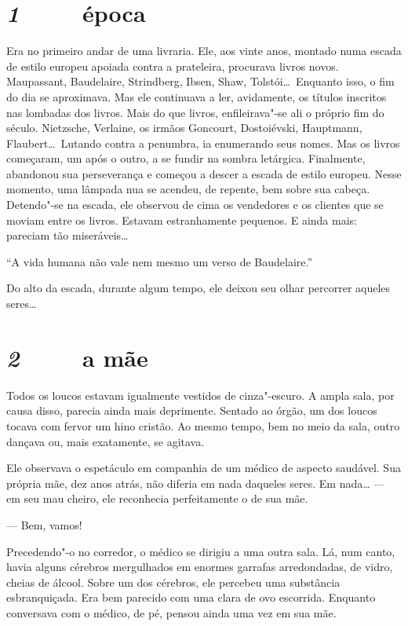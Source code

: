 \newcommand{\es}{\ \ \ \ \ }

\section*{\textit{1}\es época}
Era no primeiro andar de uma livraria. Ele, aos vinte anos, montado numa
escada de estilo europeu apoiada contra a prateleira, procurava livros
novos. Maupassant, Baudelaire, Strindberg, Ibsen, Shaw, Tolstói\ldots{}\
Enquanto isso, o fim do dia se aproximava. Mas ele continuava a ler,
avidamente, os títulos inscritos nas lombadas dos livros. Mais do que
livros, enfileirava"-se ali o próprio fim do século. Nietzsche,
Verlaine, os irmãos Goncourt, Dostoiévski, Hauptmann, Flaubert\ldots{}\
Lutando contra a penumbra, ia enumerando seus nomes. Mas os livros
começaram, um após o outro, a se fundir na sombra letárgica.
Finalmente, abandonou sua perseverança e começou a descer a escada de
estilo europeu. Nesse momento, uma lâmpada nua se acendeu, de repente,
bem sobre sua cabeça. Detendo"-se na escada, ele observou de cima os
vendedores e os clientes que se moviam entre os livros. Estavam
estranhamente pequenos. E ainda mais: pareciam tão miseráveis\ldots{}

``A vida humana não vale nem mesmo um verso de Baudelaire.''

Do alto da escada, durante algum tempo, ele deixou seu olhar percorrer
aqueles seres\ldots{}

\section*{\textit{2}\es a mãe}

Todos os loucos estavam igualmente vestidos de cinza"-escuro. A ampla
sala, por causa disso, parecia ainda mais deprimente. Sentado ao órgão,
um dos loucos tocava com fervor um hino cristão. Ao mesmo tempo, bem no
meio da sala, outro dançava ou, mais exatamente, se agitava.

Ele observava o espetáculo em companhia de um médico de aspecto
saudável. Sua própria mãe, dez anos atrás, não diferia em nada daqueles
seres. Em nada\ldots{} --- em seu mau cheiro, ele reconhecia perfeitamente o
de sua mãe.

--- Bem, vamos!

Precedendo"-o no corredor, o médico se dirigiu a uma outra sala. Lá, num
canto, havia alguns cérebros mergulhados em enormes garrafas
arredondadas, de vidro, cheias de álcool. Sobre um dos cérebros, ele
percebeu uma substância esbranquiçada. Era bem parecido com uma clara
de ovo escorrida. Enquanto conversava com o médico, de pé, pensou ainda
uma vez em sua mãe.

